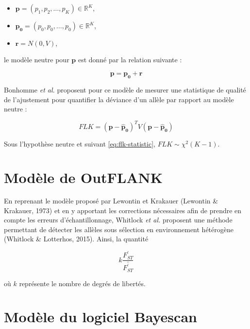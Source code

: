 \documentclass[12pt,twoside]{reedthesis}
\begin{document}
  \begin{itemize}
  \item
    \(\boldsymbol{p} = (p_1, p_2, \dots, p_K) \in \mathbb{R}^K\),
  \item
    \(\boldsymbol{p_0} = (p_0, p_0, \dots, p_0) \in \mathbb{R}^K\),
  \item
    \(\boldsymbol{r} = N(0, V)\),
  \end{itemize}
  
  le modèle neutre pour \(\boldsymbol{p}\) est donné par la relation
  suivante :
  
  \begin{equation} 
    \boldsymbol{p} = \boldsymbol{p_0} + \boldsymbol{r} 
    \label{eq:flk_neutral_model}
  \end{equation}
  
  Bonhomme \textit{et al.} proposent pour ce modèle de mesurer une
  statistique de qualité de l'ajustement pour quantifier la déviance d'un
  allèle par rapport au modèle neutre :
  
  \begin{equation} 
    FLK = (\boldsymbol{p - \hat{p}_0})^T V (\boldsymbol{p - \hat{p}_0})                                \label{eq:flk-statistic}
  \end{equation}
  
  Sous l'hypothèse neutre et suivant \eqref{eq:flk-statistic},
  \(FLK \sim \chi^2 (K - 1)\).
  
  \section{Modèle de OutFLANK}\label{modele-de-outflank}
  
  En reprenant le modèle proposé par Lewontin et Krakauer (Lewontin \&
  Krakauer, 1973) et en y apportant les corrections nécessaires afin de
  prendre en compte les erreurs d'échantillonnage, Whitlock
  \textit{et al.} proposent une méthode permettant de détecter les allèles
  sous sélection en environnement hétérogène (Whitlock \& Lotterhos,
  2015). Ainsi, la quantité
  
  \begin{equation} 
    k \frac{F_{ST}^{\prime}}{\bar{{F_{ST}^{\prime}}}}  
    \label{eq:OutFLANK-statistic}
  \end{equation}
  
  où \(k\) représente le nombre de degrés de libertés.
  
  \section{Modèle du logiciel Bayescan}\label{modele-du-logiciel-bayescan}
  
\end{document}
